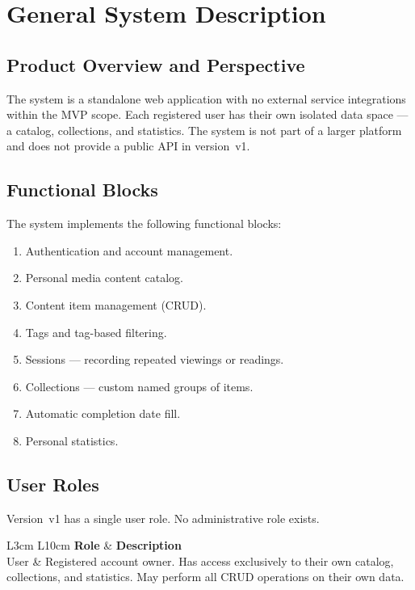 \section{General System Description}
\label{sec:zahalnyi-opys}

\subsection{Product Overview and Perspective}

The system is a standalone web application with no external service integrations within the MVP scope. Each registered user has their own isolated data space --- a catalog, collections, and statistics. The system is not part of a larger platform and does not provide a public API in version~v1. 

\subsection{Functional Blocks}

The system implements the following functional blocks:
\begin{enumerate}
  \item Authentication and account management.
  \item Personal media content catalog.
  \item Content item management (CRUD).
  \item Tags and tag-based filtering.
  \item Sessions --- recording repeated viewings or readings.
  \item Collections --- custom named groups of items.
  \item Automatic completion date fill.
  \item Personal statistics.
\end{enumerate}

\subsection{User Roles}

Version~v1 has a single user role. No administrative role exists.

\begin{table}[h]
\caption{System User Roles}
\label{tab:roli}
\begin{tabular}{L{3cm} L{10cm}}
\toprule
\textbf{Role} & \textbf{Description} \\
\midrule
User & Registered account owner. Has access exclusively to their own catalog, collections, and statistics. May perform all CRUD operations on their own data. \\
\bottomrule
\end{tabular}
\end{table}

